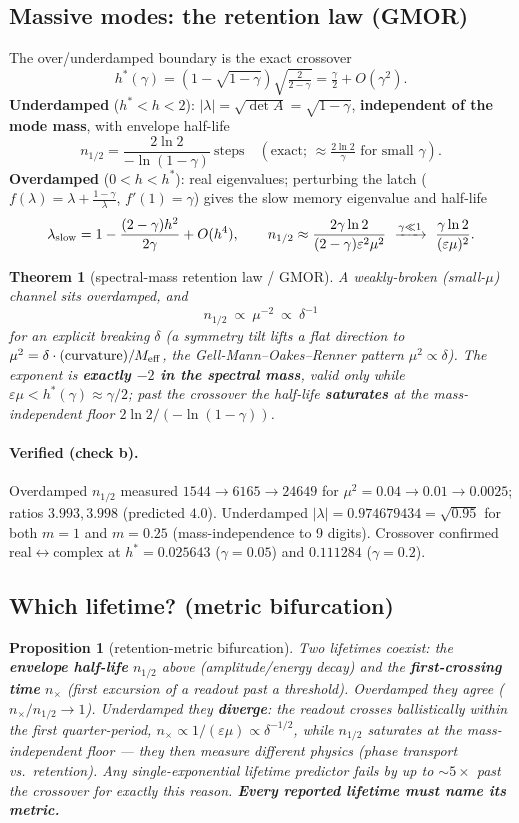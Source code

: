 \documentclass[11pt]{article}
\theoremstyle{plain}
\newtheorem{proposition}{Proposition}
\newtheorem{theorem}{Theorem}
\theoremstyle{definition}
\begin{document}
\subsection{Massive modes: the retention law (GMOR)}
The over/underdamped boundary is the exact crossover
\[ h^*(\gamma)=(1-\sqrt{1-\gamma})\sqrt{\tfrac{2}{2-\gamma}}=\tfrac\gamma2+O(\gamma^2). \]
\textbf{Underdamped} ($h^*<h<2$): $|\lambda|=\sqrt{\det A}=\sqrt{1-\gamma}$, \textbf{independent of the mode mass}, with envelope half-life
\[ n_{1/2}=\frac{2\ln2}{-\ln(1-\gamma)}\ \text{steps}\quad(\text{exact; }\approx\tfrac{2\ln2}{\gamma}\text{ for small }\gamma). \]
\textbf{Overdamped} ($0<h<h^*$): real eigenvalues; perturbing the latch ($f(\lambda)=\lambda+\tfrac{1-\gamma}{\lambda}$, $f'(1)=\gamma$) gives the slow memory eigenvalue and half-life
\[ \lambda_{\rm slow}=1-\frac{(2-\gamma)h^2}{2\gamma}+O(h^4),\qquad
n_{1/2}\approx\frac{2\gamma\ln2}{(2-\gamma)\varepsilon^2\mu^2}\ \xrightarrow{\gamma\ll1}\ \frac{\gamma\ln2}{(\varepsilon\mu)^2}. \]
\begin{theorem}[spectral-mass retention law / GMOR]\label{thm:gmor}
A weakly-broken (small-$\mu$) channel sits overdamped, and
\[ \boxed{\,n_{1/2}\ \propto\ \mu^{-2}\ \propto\ \delta^{-1}\,} \]
for an explicit breaking $\delta$ (a symmetry tilt lifts a flat direction to $\mu^2=\delta\cdot(\text{curvature})/M_{\rm eff}$, the Gell-Mann--Oakes--Renner pattern $\mu^2\propto\delta$). The exponent is \textbf{exactly $-2$ in the spectral mass}, valid only while $\varepsilon\mu<h^*(\gamma)\approx\gamma/2$; past the crossover the half-life \textbf{saturates} at the mass-independent floor $2\ln2/(-\ln(1-\gamma))$.
\end{theorem}
\paragraph{Verified (check b).} Overdamped $n_{1/2}$ measured $1544\to6165\to24649$ for $\mu^2=0.04\to0.01\to0.0025$; ratios $3.993,3.998$ (predicted $4.0$). Underdamped $|\lambda|=0.974679434=\sqrt{0.95}$ for both $m=1$ and $m=0.25$ (mass-independence to 9 digits). Crossover confirmed real$\leftrightarrow$complex at $h^*=0.025643$ ($\gamma=0.05$) and $0.111284$ ($\gamma=0.2$).

\subsection{Which lifetime? (metric bifurcation)}
\begin{proposition}[retention-metric bifurcation]\label{prop:metric}
Two lifetimes coexist: the \textbf{envelope half-life} $n_{1/2}$ above (amplitude/energy decay) and the \textbf{first-crossing time} $n_\times$ (first excursion of a readout past a threshold). Overdamped they agree ($n_\times/n_{1/2}\to1$). Underdamped they \textbf{diverge}: the readout crosses ballistically within the first quarter-period, $n_\times\propto1/(\varepsilon\mu)\propto\delta^{-1/2}$, while $n_{1/2}$ saturates at the mass-independent floor --- they then measure \emph{different physics} (phase transport vs.\ retention). Any single-exponential lifetime predictor fails by up to $\sim5\times$ past the crossover for exactly this reason. \textbf{Every reported lifetime must name its metric.}
\end{proposition}
\end{document}
